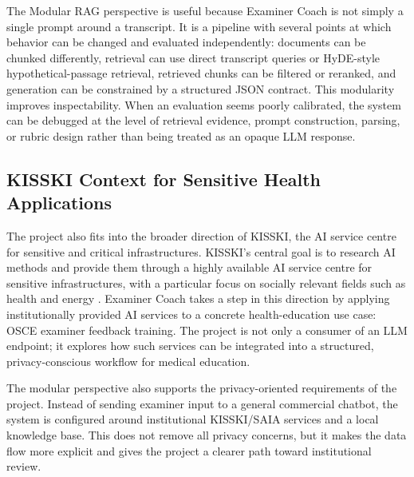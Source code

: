 The Modular RAG perspective is useful because Examiner Coach is not simply a
single prompt around a transcript. It is a pipeline with several points at which
behavior can be changed and evaluated independently: documents can be chunked
differently, retrieval can use direct transcript queries or HyDE-style
hypothetical-passage retrieval, retrieved chunks can be filtered or reranked, and generation can be
constrained by a structured JSON contract. This modularity improves
inspectability. When an evaluation seems poorly calibrated, the system can be
debugged at the level of retrieval evidence, prompt construction, parsing, or
rubric design rather than being treated as an opaque LLM response.

\subsection{KISSKI Context for Sensitive Health Applications}
The project also fits into the broader direction of KISSKI, the AI service
centre for sensitive and critical infrastructures. KISSKI's central goal is to
research AI methods and provide them through a highly available AI service
centre for sensitive infrastructures, with a particular focus on socially
relevant fields such as health and energy \cite{kisski2026mission}. Examiner
Coach takes a step in this direction by applying institutionally provided AI
services to a concrete health-education use case: OSCE examiner feedback
training. The project is not only a consumer of an LLM endpoint; it explores how
such services can be integrated into a structured, privacy-conscious workflow
for medical education.

The modular perspective also supports the privacy-oriented requirements of the
project. Instead of sending examiner input to a general commercial chatbot, the
system is configured around institutional KISSKI/SAIA services and a local
knowledge base. This does not remove all privacy concerns, but it makes the data
flow more explicit and gives the project a clearer path toward institutional
review.
